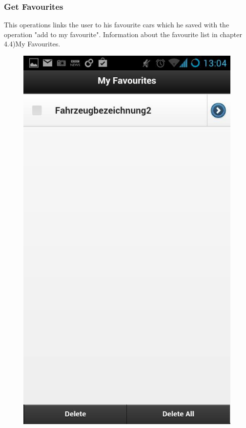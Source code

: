 \subsubsection{Get Favourites}
This operations links the user to his favourite cars which he saved with the operation "add to my favourite". Information about the favourite list in chapter 4.4)My Favourites.
\\
\begin{figure}[H]
\centering
\includegraphics[width=0.5\linewidth]{graphics/chapter4/10}
\caption{}
\label{fig:11}
\end{figure}
\newpage

